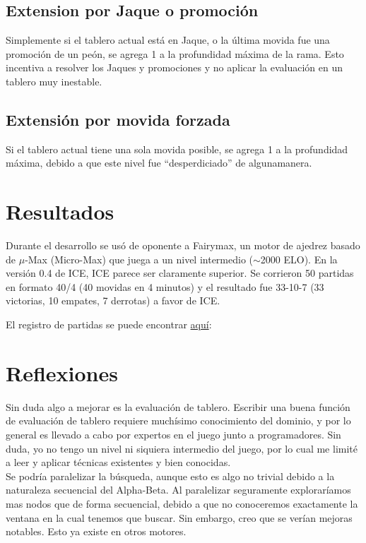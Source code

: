 \documentclass{article}
\begin{document}
\subsection{Extension por Jaque o promoción}
Simplemente si el tablero actual está en Jaque, o la última movida fue
una promoción de un peón, se agrega 1 a la profundidad máxima de la
rama. Esto incentiva a resolver los Jaques y promociones y no aplicar la
evaluación en un tablero muy inestable.

\subsection{Extensión por movida forzada}
Si el tablero actual tiene una sola movida posible, se agrega 1 a la
profundidad máxima, debido a que este nivel fue ``desperdiciado'' de
algunamanera.

\section{Resultados}
Durante el desarrollo se usó de oponente a Fairymax, un motor de
ajedrez basado de $\mu$-Max (Micro-Max) que juega a un nivel intermedio
($\sim$2000 ELO). En la versión 0.4 de ICE, ICE parece ser claramente
superior. Se corrieron 50 partidas en formato 40/4 (40 movidas en
4 minutos) y el resultado fue 33-10-7 (33 victorias, 10 empates, 7
derrotas) a favor de ICE.

El registro de partidas se puede encontrar
\href{http://labdcc.fceia.unr.edu.ar/~gmartinez/ice\_fairy\_40\_4.pgn}
{aquí}:

\section{Reflexiones}
Sin duda algo a mejorar es la evaluación de tablero. Escribir una buena
función de evaluación de tablero requiere muchísimo conocimiento
del dominio, y por lo general es llevado a cabo por expertos en el
juego junto a programadores. Sin duda, yo no tengo un nivel ni siquiera
intermedio del juego, por lo cual me limité a leer y aplicar técnicas
existentes y bien conocidas.
\\

Se podría paralelizar la búsqueda, aunque esto es algo no trivial
debido a la naturaleza secuencial del Alpha-Beta. Al paralelizar
seguramente exploraríamos mas nodos que de forma secuencial, debido a
que no conoceremos exactamente la ventana en la cual tenemos que buscar.
Sin embargo, creo que se verían mejoras notables. Esto ya existe en
otros motores.
\\
\end{document}
